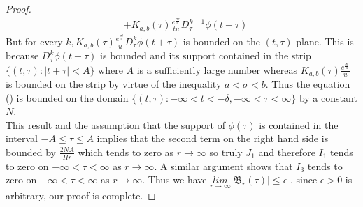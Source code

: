 \begin{proof}
\begin{align*}
 &+K_{a,b}(\tau)\frac{e^{\frac{\sigma \tau}{u}}}{tu}D_{\tau}^{k+1}\phi(t+\tau)
 \end{align*}
 But for every $k, K_{a,b}(\tau)\frac{e^{\frac{\sigma t}{u}}}{u}D_{\tau}^{k}\phi(t+\tau) $ is bounded on the $ (t,\tau) $ plane. This is because $ D_{\tau}^{k}\phi(t+\tau) $ is bounded and its support contained in the strip $\lbrace(t,\tau):\vert t+\tau \vert < A\rbrace $ where $A$ is a sufficiently large number whereas $K_{a,b}(\tau)\frac{e^{\frac{\sigma t}{u}}}{u} $ is bounded on the strip by virtue of the inequality $ a <\sigma < b. $ Thus the equation () is bounded on the domain $ \lbrace  (t,\tau): -\infty < t < -\delta ,-\infty < \tau < \infty \rbrace $ by a constant $N$.\\
 This result and the assumption that the support of $ \phi(\tau) $ is contained in the interval $-A \leq \tau \leq A$ implies that the second term on the right hand side is bounded by $\frac{2NA}{\Pi r}$ which tends to zero as $ r \rightarrow \infty $ so truly $ J_{1} $ and therefore $ I_{1} $ tends to zero on $ -\infty < \tau < \infty $ as $ r \rightarrow \infty $. A similar argument shows that $ I_{3} $ tends to zero on $ -\infty < \tau < \infty $ as $ r \rightarrow \infty $. Thus we have $ \underset{r \rightarrow \infty}{lim}\vert\mathfrak{B}_{r}(\tau)\vert\leq\epsilon $ , since $ \epsilon >0 $
 is arbitrary, our proof is complete.
\end{proof} 
